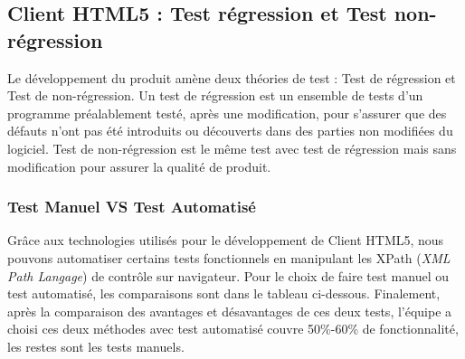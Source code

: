     
\subsection{Client HTML5 : Test régression et Test non-régression}
	Le développement du produit amène deux théories de test : Test de régression et Test de non-régression. Un test de régression est un ensemble de tests d'un programme préalablement testé, après une modification, pour s'assurer que des défauts n'ont pas été introduits ou découverts dans des parties non modifiées du logiciel. Test de non-régression est le même test avec test de régression mais sans modification pour assurer la qualité de produit.

    \subsubsection{Test Manuel VS Test Automatisé}
    Grâce aux technologies utilisés pour le développement de Client HTML5, nous pouvons automatiser certains tests fonctionnels en manipulant les XPath (\textit{XML Path Langage}) de contrôle sur navigateur. Pour le choix de faire test manuel ou test automatisé, les comparaisons sont dans le tableau ci-dessous. Finalement, après la comparaison des avantages et désavantages de ces deux tests, l'équipe a choisi ces deux méthodes avec test automatisé couvre 50\%-60\% de fonctionnalité, les restes sont les tests manuels.

